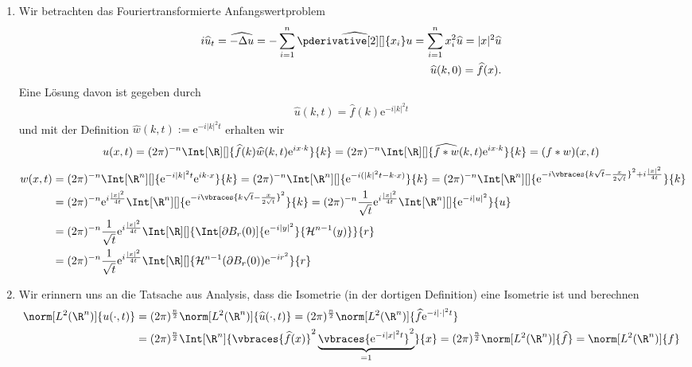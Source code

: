 \begin{solution}
	\phantom{}
	\begin{enumerate}[label = (\roman*)]
		\item Wir betrachten das Fouriertransformierte Anfangswertproblem
			\begin{align*}
			i \widehat{u}_t = \widehat{- \Delta u} = - \sum_{i = 1}^n \widehat{\pderivative[2][]{x_i}u} = \sum_{i = 1}^n x_i^2 \widehat{u} = |x|^2 \widehat{u} \\
			\widehat{u}(k,0) = \widehat{f}(x).
			\end{align*}
			Eine Lösung davon ist gegeben durch
			\begin{align*}
			\widehat{u}(k,t) = \widehat{f}(k) \mathrm{e}^{-i|k|^2t}
			\end{align*}
			und mit der Definition $\widehat{w}(k,t) := \mathrm{e}^{-i|k|^2t}$ erhalten wir
			\begin{align*}
			u(x,t) = (2\pi)^{-n} \Int[\R][]{\widehat{f}(k) \widehat{w}(k,t) \mathrm{e}^{i x \cdot k}}{k} = (2\pi)^{-n} \Int[\R][]{\widehat{f \ast w}(k, t) \mathrm{e}^{i x \cdot k}}{k} = (f \ast w)(x,t)
			\end{align*}
			\begin{align*}
			w(x,t) &= (2 \pi)^{-n} \Int[\R^n][]{\mathrm{e}^{- i |k|^2 t} \mathrm{e}^{i k \cdot x}}{k} = (2 \pi)^{-n} \Int[\R^n][]{\mathrm{e}^{- i (|k|^2 t - k \cdot x)}}{k} = (2 \pi)^{-n} \Int[\R^n][]{\mathrm{e}^{- i \vbraces{k \sqrt{t} - \frac{x}{2 \sqrt{t}}}^2 + i\frac{|x|^2}{4t}}}{k} \\
			&= (2 \pi)^{-n} \mathrm{e}^{i\frac{|x|^2}{4t}} \Int[\R^n][]{\mathrm{e}^{- i \vbraces{k \sqrt{t} - \frac{x}{2 \sqrt{t}}}^2}}{k} = (2 \pi)^{-n} \frac{1}{\sqrt{t}} \mathrm{e}^{i\frac{|x|^2}{4t}} \Int[\R^n][]{\mathrm{e}^{- i|u|^2}}{u} \\
			&= (2 \pi)^{-n} \frac{1}{\sqrt{t}} \mathrm{e}^{i\frac{|x|^2}{4t}} \Int[\R][]{\Int[\partial B_r(0)]{\mathrm{e}^{- i|y|^2}}{\mathcal{H}^{n - 1}(y)}}{r} \\
			&= (2 \pi)^{-n} \frac{1}{\sqrt{t}} \mathrm{e}^{i\frac{|x|^2}{4t}}  \Int[\R][]{\mathcal{H}^{n - 1}(\partial B_r(0))\mathrm{e}^{- ir^2}}{r}
			\end{align*}
		\item Wir erinnern uns an die Tatsache aus Analysis, dass die Isometrie (in der dortigen Definition) eine Isometrie ist und berechnen
		\begin{align*}
		\norm[L^2(\R^n)]{u(\cdot, t)} &= (2 \pi)^{\frac{n}{2}} \norm[L^2(\R^n)]{\widehat{u}(\cdot, t)} = (2 \pi)^{\frac{n}{2}} \norm[L^2(\R^n)]{\widehat{f} \mathrm{e}^{-i |\cdot|^2 t}} \\
		&= (2 \pi)^{\frac{n}{2}} \Int[\R^n]{\vbraces{\widehat{f}(x)}^2 \underbrace{\vbraces{\mathrm{e}^{-i |x|^2 t}}^2}_{= 1}}{x} = (2 \pi)^{\frac{n}{2}} \norm[L^2(\R^n)]{\widehat{f}} = \norm[L^2(\R^n)]{f} 
		\end{align*}
	\end{enumerate}

\end{solution}

